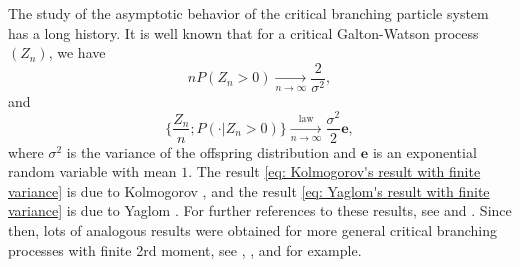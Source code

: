 \documentclass[12pt, a4paper]{amsart}
\theoremstyle{definition}
\numberwithin{equation}{section}
\begin{document}
	The study of the asymptotic behavior of the critical branching particle system has a long history.
	It is well known that for a critical Galton-Watson process $(Z_n)$, we have
	\[\label{eq: Kolmogorov's result with finite variance}
		n P(Z_n > 0) 
		\xrightarrow[n\to \infty]{} \frac{2}{\sigma^2},
	\]
	and
	\[\label{eq: Yaglom's result with finite variance}
		\Big\{ \frac{Z_n}{n}; P(\cdot| Z_n > 0) \Big\}
		\xrightarrow[n \to \infty]{\operatorname{law}} \frac{\sigma^2}{2} \mathbf e, 
	\]
	where $\sigma^2$ is the variance of the offspring distribution and $\mathbf e$ is an exponential random variable with mean $1$.
	The result \eqref{eq: Kolmogorov's result with finite variance} is due to Kolmogorov \cite{Kolmogorov1938Zur-losung}, and the result \eqref{eq: Yaglom's result with finite variance} is due to Yaglom \cite{Yaglom1947Certain}. 
	For further references to these results, see \cite{Harris2002The-theory} and \cite{KestenNeySpitzer1966The-Galton-Watson}.  
	Since then, lots of analogous results were obtained for more general critical branching processes with finite 2rd moment, see \cite{AsmussenHering1983Branching}, \cite{AthreyaNey1974Functionals}, \cite{AthreyaNey1972Branching} and \cite{JoffeSpitzer1967On-multitype} for example.
	
\end{document}

